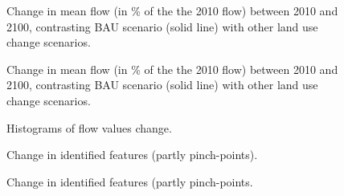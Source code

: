 
\begin{figure}[h!]
 \caption{Change in mean flow (in \% of the the 2010 flow) between 2010 and 2100, contrasting BAU scenario (solid line) with other land use change scenarios.}
 \label{fig:flow_linear_1}
\end{figure}


\begin{figure}[h!]
 \caption{Change in mean flow (in \% of the the 2010 flow) between 2010 and 2100, contrasting BAU scenario (solid line) with other land use change scenarios.}
 \label{fig:flow_radar_1}
\end{figure}


\begin{figure}[h!]
 \caption{Histograms of flow values change.}
 \label{fig:hist_1}
\end{figure}



\begin{figure}[h!]
 \caption{Change in identified features (partly pinch-points).}
 \label{fig:surf_linear_1}
\end{figure}


\begin{figure}[h!]
 \caption{Change in identified features (partly pinch-points.}
 \label{fig:surf_radar_1}
\end{figure}


\clearpage